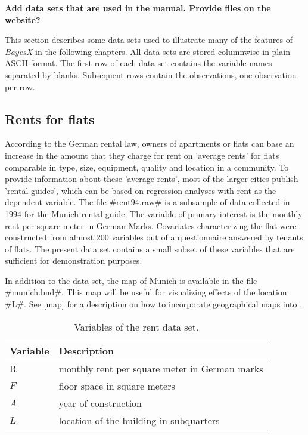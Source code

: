 {\color{red}\bfseries Add data sets that are used in the manual. Provide files on the website?}

This section describes some data sets used to illustrate many of the features of {\em BayesX} in the following chapters. All data sets are stored columnwise in
plain ASCII-format. The first row of each data set contains the variable names separated by blanks. Subsequent rows contain the observations, one observation per row.

\subsection{Rents for flats}
 \label{rentdata} 

According to the German rental law, owners of apartments or flats can base an increase in the amount that they charge for rent on 'average rents' for flats comparable in type, size, equipment,
quality and location in a community. To provide information about these 'average rents', most of the larger cities publish 'rental guides', which can be based on regression analyses with rent as
the dependent variable. The file #rent94.raw# is a subsample of data collected in 1994 for the Munich rental guide. The variable of primary interest is the monthly rent per square meter in German Marks. Covariates characterizing the flat were constructed from almost 200 variables out of a questionnaire answered by tenants of flats. The present data set contains a small subset of these variables that are sufficient for demonstration purposes.

In addition to the data set, the map of Munich is available in the file #munich.bnd#. This map will be useful for visualizing effects of the location #L#. See \autoref{map} for a description on how to incorporate geographical maps into \BayesX.

\begin{table}

\centering
\begin{tabular}{|l|l|}
\hline
{\bf Variable} & {\bf Description} \\
\hline
R & monthly rent per square meter in German marks \\
$F$ & floor space in square meters \\
$A$ & year of construction \\
$L$ & location of the building in subquarters \\
 \hline
\end{tabular}
{\em \caption{\label{rentdatavar}Variables of the rent data set.}}
\end{table}

